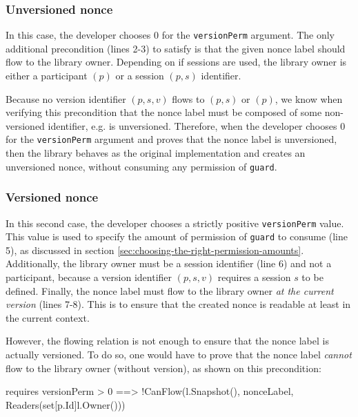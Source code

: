 \subsubsection{Unversioned nonce}
\label{sec:unversioned-nonce}

In this case, the developer chooses $0$ for the \texttt{versionPerm} argument.
The only additional precondition (lines 2-3) to satisfy is that the given nonce label should flow to the library owner.
Depending on if sessions are used, the library owner is either a participant $(p)$ or a session $(p,s)$ identifier.

Because no version identifier $(p,s,v)$ flows to $(p,s)$ or $(p)$, we know when verifying this precondition that the nonce label must be composed of some non-versioned identifier, e.g. is unversioned.
Therefore, when the developer chooses $0$ for the \texttt{versionPerm} argument and proves that the nonce label is unversioned, then the library behaves as the original implementation and creates an unversioned nonce, without consuming any permission of \texttt{guard}.

\subsubsection{Versioned nonce}
\label{sec:versioned-nonce}

In this second case, the developer chooses a strictly positive \texttt{versionPerm} value.
This value is used to specify the amount of permission of \texttt{guard} to consume (line 5), as discussed in section \ref{sec:choosing-the-right-permission-amounts}.
Additionally, the library owner must be a session identifier (line 6) and not a participant, because a version identifier $(p,s,v)$ requires a session $s$ to be defined.
Finally, the nonce label must flow to the library owner \emph{at the current version} (lines 7-8).
This is to ensure that the created nonce is readable at least in the current context.

However, the flowing relation is not enough to ensure that the nonce label is actually versioned. To do so, one would have to prove that the nonce label \emph{cannot} flow to the library owner (without version), as shown on this precondition:

\begin{gobra}
requires versionPerm > 0 ==>
    !CanFlow(l.Snapshot(), nonceLabel, Readers(set[p.Id]{l.Owner()}))
\end{gobra}

